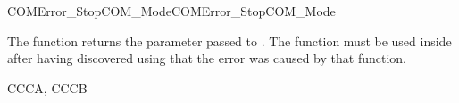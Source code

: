 \begin{function_nopb2}{COMError\_StopCOM\_Mode}{COMError_StopCOM_Mode}
  \begin{fundescription}
    The function returns the  parameter passed to
    . The function must be used inside
     after having discovered using
     that the error was caused by that
    function.
  \end{fundescription}
  \begin{funreturn}
  \end{funreturn}
  \begin{funconformance}
   CCCA, CCCB
  \end{funconformance}
\end{function_nopb2}




